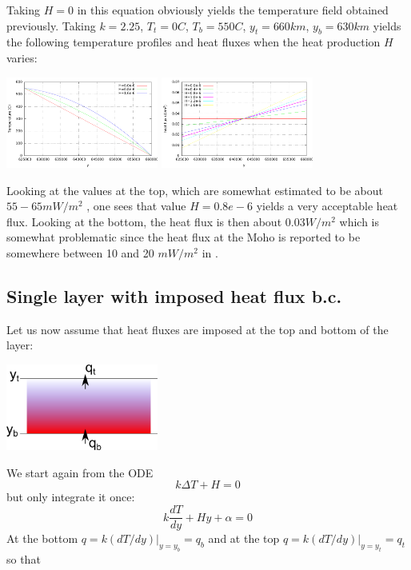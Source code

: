 Taking $H=0$ in this equation obviously yields the temperature field obtained previously.
Taking $k=2.25$, $T_t=0C$, $T_b=550C$, $y_t=660km$, $y_b=630km$ yields the following
temperature profiles and heat fluxes when the heat production $H$ varies:
\begin{center}
\includegraphics[width=5cm]{images/initial_temperature/temperature1.pdf}
\includegraphics[width=5cm]{images/initial_temperature/heatflux1.pdf}
\end{center}
Looking at the values at the top, which are somewhat estimated to be
about $55-65mW/m^2$ \cite[table 8.6]{jama}, one sees that value $H=0.8e-6$ yields a very acceptable
heat flux.
Looking at the bottom, the heat flux is then about $0.03W/m^2$
which is somewhat problematic since the heat flux at the Moho
is reported to be somewhere between 10 and 20 $mW/m^2$ in \cite[table 7.1]{jama}.


\subsection{Single layer with imposed heat flux b.c.}

Let us now assume that heat fluxes are imposed at the top and bottom of the layer:
\begin{center} 
\includegraphics[width=5cm]{images/initial_temperature/tempcond2.png}
\end{center}

We start again from the ODE
\[
k \Delta T + H = 0 
\]
but only integrate it once:
\[
k \frac{dT}{dy}  + H y + \alpha  = 0 
\]
At the bottom $q=k(dT/dy)|_{y=y_b} = q_b$ and at the top
$q=k(dT/dy)|_{y=y_t} = q_t$ so that 

